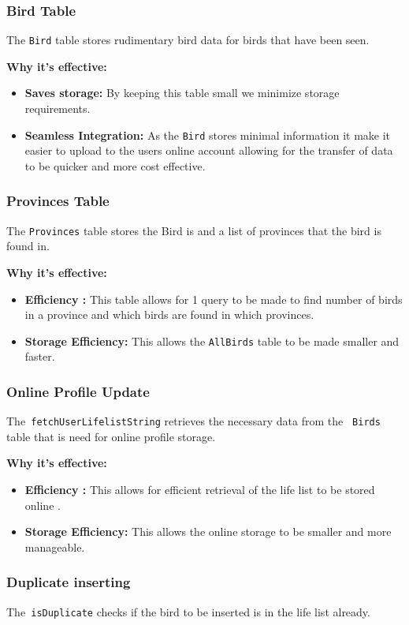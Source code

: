 \documentclass[a4paper]{article}
\begin{document}
\subsubsection{Bird Table }
The \texttt{Bird} table stores rudimentary bird data for birds that have been seen.

\textbf{Why it's effective:}
\begin{itemize}
    \item \textbf{Saves storage:} By keeping this table small we minimize storage requirements.
    \item \textbf{Seamless Integration:} As the \texttt{Bird} stores minimal information it make it easier to upload to the users online account allowing for the transfer of data to be quicker and more cost effective.
\end{itemize}

\subsubsection{Provinces Table }
The \texttt{Provinces} table stores the Bird is and a list of provinces that the bird is found in.

\textbf{Why it's effective:}
\begin{itemize}
    \item \textbf{Efficiency :} This table allows for 1 query to be made to find number of birds in a province and which birds are found in which provinces.
    \item \textbf{Storage Efficiency:} This allows the \texttt{AllBirds} table to be made smaller and faster.
\end{itemize}

\subsubsection{Online Profile Update}
The\texttt{\ fetchUserLifelistString} retrieves the necessary data from the \texttt{\ Birds} table that is need for online profile storage.

\textbf{Why it's effective:}
\begin{itemize}
    \item \textbf{Efficiency :} This allows for efficient retrieval of the life list to be stored online .
    \item \textbf{Storage Efficiency:} This allows the online storage to be smaller and more manageable.
\end{itemize}

\subsubsection{Duplicate inserting}
The\texttt{\ isDuplicate} checks if the bird to be inserted is in the life list already.
\end{document}
